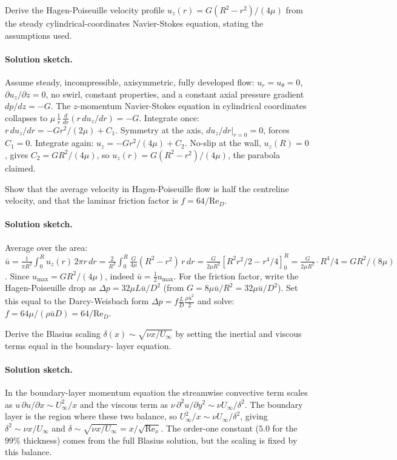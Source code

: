 \begin{exercise}
Derive the Hagen-Poiseuille velocity profile $u_z(r) = G(R^2 -
r^2)/(4\mu)$ from the steady cylindrical-coordinates Navier-Stokes
equation, stating the assumptions used.

\paragraph{Solution sketch.} Assume steady, incompressible,
axisymmetric, fully developed flow: $u_r = u_\theta = 0$,
$\partial u_z/\partial z = 0$, no swirl, constant properties, and a
constant axial pressure gradient $dp/dz = -G$. The $z$-momentum
Navier-Stokes equation in cylindrical coordinates collapses to
$\mu\,\tfrac1r\,\tfrac{d}{dr}(r\,du_z/dr) = -G$. Integrate once:
$r\,du_z/dr = -Gr^2/(2\mu) + C_1$. Symmetry at the axis,
$du_z/dr|_{r=0} = 0$, forces $C_1 = 0$. Integrate again:
$u_z = -Gr^2/(4\mu) + C_2$. No-slip at the wall, $u_z(R) = 0$,
gives $C_2 = GR^2/(4\mu)$, so $u_z(r) = G(R^2 - r^2)/(4\mu)$, the
parabola claimed.
\end{exercise}

\begin{exercise}
Show that the average velocity in Hagen-Poiseuille flow is half
the centreline velocity, and that the laminar friction factor is
$f = 64/\text{Re}_D$.

\paragraph{Solution sketch.} Average over the area:
$\bar u = \tfrac{1}{\pi R^2}\int_0^R u_z(r)\,2\pi r\,dr =
\tfrac{2}{R^2}\int_0^R \tfrac{G}{4\mu}(R^2 - r^2)\,r\,dr =
\tfrac{G}{2\mu R^2}[R^2 r^2/2 - r^4/4]_0^R = \tfrac{G}{2\mu R^2}
\cdot R^4/4 = GR^2/(8\mu)$. Since $u_{\max} = GR^2/(4\mu)$, indeed
$\bar u = \tfrac12 u_{\max}$. For the friction factor, write the
Hagen-Poiseuille drop as $\Delta p = 32\mu L\bar u/D^2$ (from
$G = 8\mu\bar u/R^2 = 32\mu\bar u/D^2$). Set this equal to the
Darcy-Weisbach form $\Delta p = f\tfrac{L}{D}\tfrac{\rho\bar u^2}{2}$
and solve: $f = 64\mu/(\rho\bar u D) = 64/\text{Re}_D$.
\end{exercise}

\begin{exercise}
Derive the Blasius scaling $\delta(x) \sim \sqrt{\nu x/U_\infty}$
by setting the inertial and viscous terms equal in the boundary-
layer equation.

\paragraph{Solution sketch.} In the boundary-layer momentum equation
the streamwise convective term scales as $u\,\partial u/\partial x
\sim U_\infty^2/x$ and the viscous term as $\nu\,\partial^2 u/
\partial y^2 \sim \nu U_\infty/\delta^2$. The boundary layer is the
region where these two balance, so $U_\infty^2/x \sim \nu U_\infty/
\delta^2$, giving $\delta^2 \sim \nu x/U_\infty$ and
$\delta \sim \sqrt{\nu x/U_\infty} = x/\sqrt{\text{Re}_x}$. The
order-one constant ($5.0$ for the $99\%$ thickness) comes from the
full Blasius solution, but the scaling is fixed by this balance.
\end{exercise}

